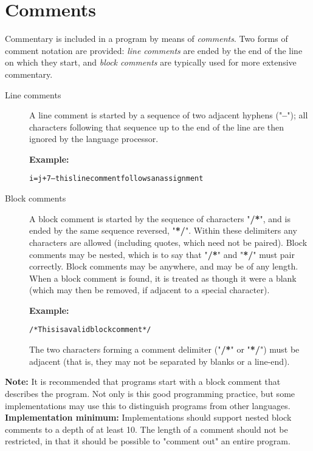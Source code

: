 \section{Comments}\label{refcomment}
\index{,}
\index{,}
\index{,}
 Commentary is included in a \nr{} program by means of
\emph{comments}.  Two forms of comment notation are provided:
\emph{line comments} are ended by the end of the line on which they
start, and \emph{block comments} are typically used for more extensive
commentary.
\begin{description}
\item[Line comments]\label{reflineco}

A line comment is started by a sequence of two adjacent hyphens
("\textbf{--}"); all characters following that sequence up to the
end of the line are then ignored by the \nr{} language processor.
 
\textbf{Example:}
\begin{alltt}
i=j+7  -- this line comment follows an assignment
\end{alltt}
\item[Block comments]\label{refblockco}
 A block comment is started by the sequence of characters
"\textbf{/*}", and is ended by the same sequence reversed,
"\textbf{*/}".
Within these delimiters any characters are allowed (including quotes,
which need not be paired).
Block comments may be nested, which is to say that
"\textbf{/*}" and "\textbf{*/}" must pair correctly.
Block comments may be anywhere, and may be of any length.
When a block comment is found, it is treated as though it were a blank
(which may then be removed, if adjacent to a special character).
 
\textbf{Example:}
\begin{alltt}
/* This is a valid block comment */
\end{alltt}
The two characters forming a comment delimiter
("\textbf{/*}" or "\textbf{*/}") must be adjacent
(that is, they may not be separated by blanks or a line-end).
\end{description}
\begin{shaded}\noindent
\textbf{Note: }It is recommended that \nr{} programs start with a block comment
that describes the program.
Not only is this good programming practice, but some implementations may
use this to distinguish \nr{} programs from other languages.
 \textbf{Implementation minimum:} Implementations should support
nested block comments to a depth of at least 10.
The length of a comment should not be restricted, in that it should be
possible to "comment out" an entire program.
\end{shaded}\indent
